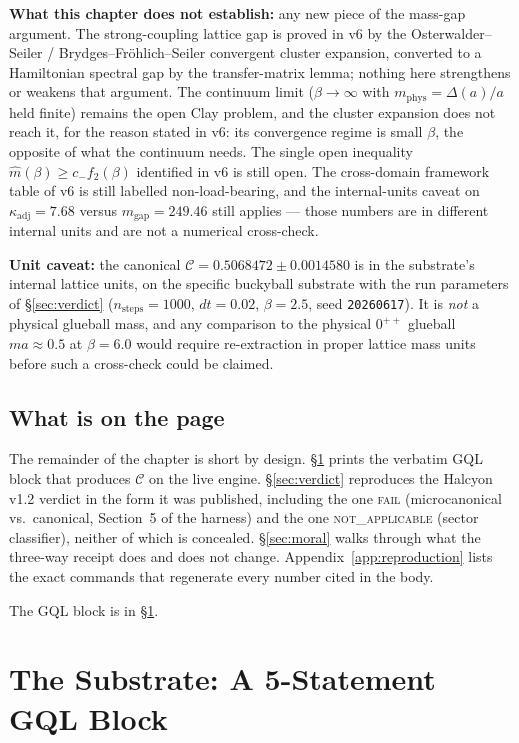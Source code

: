\documentclass[12pt,a4paper]{article}
\theoremstyle{plain}
\theoremstyle{definition}
\theoremstyle{remark}
\begin{document}
\textbf{What this chapter does not establish:} any new piece of the mass-gap argument. The strong-coupling lattice gap is proved in v6 by the Osterwalder--Seiler / Brydges--Fr\"ohlich--Seiler convergent cluster expansion, converted to a Hamiltonian spectral gap by the transfer-matrix lemma; nothing here strengthens or weakens that argument. The continuum limit ($\beta \to \infty$ with $m_{\text{phys}} = \Delta(a)/a$ held finite) remains the open Clay problem, and the cluster expansion does not reach it, for the reason stated in v6: its convergence regime is small $\beta$, the opposite of what the continuum needs. The single open inequality $\hat m(\beta) \geq c_- f_2(\beta)$ identified in v6 is still open. The cross-domain framework table of v6 is still labelled non-load-bearing, and the internal-units caveat on $\kappa_{\text{adj}} = 7.68$ versus $m_{\text{gap}} = 249.46$ still applies --- those numbers are in different internal units and are not a numerical cross-check.

\textbf{Unit caveat:} the canonical $\mathcal{C} = 0.5068472 \pm 0.0014580$ is in the substrate's internal lattice units, on the specific buckyball substrate with the run parameters of \S\ref{sec:verdict} ($n_{\text{steps}}=1000$, $dt=0.02$, $\beta=2.5$, seed \texttt{20260617}). It is \emph{not} a physical glueball mass, and any comparison to the physical $0^{++}$ glueball $ma \approx 0.5$ at $\beta=6.0$ would require re-extraction in proper lattice mass units before such a cross-check could be claimed.

\subsection{What is on the page}

The remainder of the chapter is short by design. \S\ref{sec:substrate} prints the verbatim GQL block that produces $\mathcal{C}$ on the live engine. \S\ref{sec:verdict} reproduces the Halcyon v1.2 verdict in the form it was published, including the one \textsc{fail} (microcanonical vs.\ canonical, Section~5 of the harness) and the one \textsc{not\_applicable} (sector classifier), neither of which is concealed. \S\ref{sec:moral} walks through what the three-way receipt does and does not change. Appendix~\ref{app:reproduction} lists the exact commands that regenerate every number cited in the body.

The GQL block is in \S\ref{sec:substrate}.

\section{The Substrate: A 5-Statement GQL Block}
\label{sec:substrate}
\end{document}
